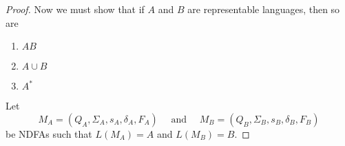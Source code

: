 \documentclass{bcthesis}
\begin{document}
\begin{proof}
		Now we must show that if $A$ and $B$ are representable languages, then so are
		\begin{enumerate}[label=(\roman*), itemsep = -0.3 ex, nolistsep]
			\item $AB$
			\item $A \cup B$
			\item $A^*$
		\end{enumerate}

			\newcommand{\ma}{\ensuremath{M_A}\xspace}
				\newcommand{\qa}{\ensuremath{Q_A}\xspace}
				\newcommand{\siga}{\ensuremath{\Sigma_A}\xspace}
				\newcommand{\sa}{\ensuremath{s_A}\xspace}
				\newcommand{\dala}{\ensuremath{\delta_A}\xspace}
				\newcommand{\fa}{\ensuremath{F_A}\xspace}

			\newcommand{\mb}{\ensuremath{M_B}\xspace}
				\newcommand{\qb}{\ensuremath{Q_B}\xspace}
				\newcommand{\sigb}{\ensuremath{\Sigma_B}\xspace}
				\renewcommand{\sb}{\ensuremath{s_B}\xspace}
				\newcommand{\dalb}{\ensuremath{\delta_B}\xspace}
				\newcommand{\fb}{\ensuremath{F_B}\xspace}

			\newcommand{\mab}{\ensuremath{M_{AB}}\xspace}
				\newcommand{\qab}{\ensuremath{Q_{AB}}\xspace}
				\newcommand{\sigab}{\ensuremath{\Sigma_{AB}}\xspace}
				\newcommand{\sab}{\ensuremath{s_{AB}}\xspace}
				\newcommand{\dalab}{\ensuremath{\delta_{AB}}\xspace}
				\newcommand{\fab}{\ensuremath{F_{AB}}\xspace}

			\newcommand{\maub}{\ensuremath{M_{A \cup B}}\xspace}
				\newcommand{\qaub}{\ensuremath{Q_{A \cup B}}\xspace}
				\newcommand{\sigaub}{\ensuremath{\Sigma_{A \cup B}}\xspace}
				\newcommand{\saub}{\ensuremath{s_{A \cup B}}\xspace}
				\newcommand{\dalaub}{\ensuremath{\delta_{A \cup B}}\xspace}
				\newcommand{\faub}{\ensuremath{F_{A \cup B}}\xspace}

			\newcommand{\mas}{\ensuremath{M_{A^*}}\xspace}
				\newcommand{\qas}{\ensuremath{Q_{A^*}}\xspace}
				\newcommand{\sigas}{\ensuremath{\Sigma_{A^*}}\xspace}
				\newcommand{\sas}{\ensuremath{s_{A^*}}\xspace}
				\newcommand{\dalas}{\ensuremath{\delta_{A^*}}\xspace}
				\newcommand{\fas}{\ensuremath{F_{A^*}}\xspace}


		Let 
		\[
			M_A = (Q_A, \Sigma_A, s_A, \delta_A, F_A) \quad \text{ and } \quad M_B = (Q_B, \Sigma_B, s_B, \delta_B, F_B)
		\]
		be NDFAs such that $L(\ma) = A$ and $L(\mb) = B$.


\end{proof}
\end{document}

